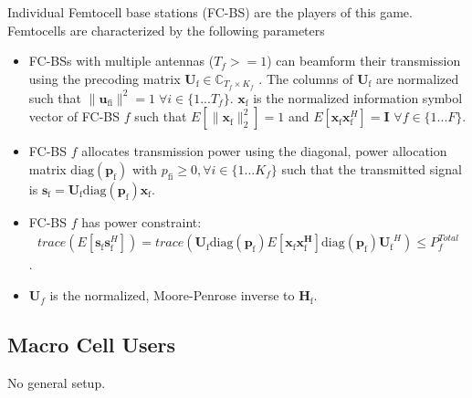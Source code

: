 \documentclass[12pt,a4paper]{report}
\begin{document}
Individual Femtocell base stations (FC-BS) are the players of this game.
\\
Femtocells are characterized by the following parameters
\begin{itemize}
\item 
	FC-BSs with multiple antennas ($T_f >=1$) can beamform their transmission using the precoding 	
	matrix $\mathbf{U}_{\mathrm{f}} \in \mathbb{C}_{T_f \times K_f}$ .
	The columns of $\mathbf{U}_{\mathrm{f}}$ are normalized such that 
	 $\|\mathbf{u}_{\mathrm{fi}}\|^2 =1 \;\forall i \in \{1 ... T_f\}$.
	 $\mathbf{x_{\mathrm{f}}}$ is the 		
	normalized information symbol vector of FC-BS $f$ such that $E[\|\mathbf{x}_{\mathrm{f}}
	\|_2^2]=1$ and $E[\mathbf{x}_{\mathrm{f}}\mathbf{x}_{\mathrm{f}}^H]=\mathbf{I}$ $\forall f \in \{1 ... F\}$.
\\
\item  
	FC-BS $f$ allocates  transmission power using the diagonal, power allocation  	
	matrix $\mathrm{diag}(\mathbf{p}_{\mathrm{f}})$ with $p_{\mathrm{fi}} \geq 0, \forall i \in \{1 ... K_f\}$
such that the transmitted 		
	signal is 
	$\mathbf{s}_{\mathrm{f}	}= \mathbf{U_{\mathrm{f}}} 
	\mathrm{diag}(\mathbf{p}_{\mathrm{f}})
	\mathbf{x_{\mathrm{f}}}$.
\\
\item 
	FC-BS $f$ has power constraint:
	\begin{gather*}
	trace(E[\mathbf{s}_\mathrm{f}\mathbf{s}_\mathrm{f}^H]) =
	 trace(\mathbf{U_{\mathrm{f}}} 
	\mathrm{diag}(\mathbf{p}_{\mathrm{f}})
	E[\mathbf{x_{\mathrm{f}}}
	\mathbf{x_{\mathrm{f}}^H}]
	\mathrm{diag}(\mathbf{p}_{\mathrm{f}})
	\mathbf{U_{\mathrm{f}}}^H 
	)
	  \leq P^{Total}_{f} 
	  	\end{gather*}.


\item 
$\mathbf{U}_f$ is the normalized, Moore-Penrose inverse to $\mathbf{H_\mathrm{f}}$.
\end{itemize}

\subsection{Macro Cell Users}
No general setup.
\end{document}
